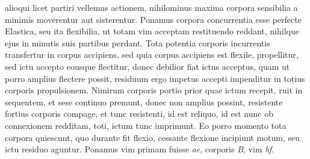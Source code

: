 alioqui licet partiri vellemus actionem, nihilominus maxima corpora sensibilia\protect{} a minimis moverentur 
aut sisterentur.
\pend
\newpage
\pstart
%
%
Ponamus corpora concurrentia esse perfecte Elastica\protect{}, seu ita flexibilia\protect{}, ut totam vim 
acceptam\protect{} restituendo reddant, nihilque ejus in minutis suis partibus 
%
% 
perdant.
\pend \pstart
Tota potentia\protect{} corporis 
%
incurrentis transfertur in corpus accipiens, sed 
%
quia %
corpus accipiens est flexile,
%
%
propellitur, sed ictu accepto\protect{} eousque
flectitur, donec debilior fiat ictus acceptus\protect{}, quam ut porro amplius flectere possit, residuum %
ergo impetus accepti\protect{} impenditur in totius corporis propulsionem.
%
Nimirum corporis 
portio prior quae ictum recepit, ruit in sequentem, et sese continuo premunt, donec 
non amplius possint, resistente fortius corporis compage, et tunc resistenti, id est reliquo,
id est nunc ob connexionem redditam, toti, ictum tunc imprimunt. Eo porro momento
tota corpora quiescunt, quo durante fit flexio\protect{}, cessante flexione\protect{} incipiunt motum, seu ictu
residuo aguntur. Ponamus 
%
%
vim primam fuisse
\textit{ae}, corporis \textit{B}, vim \textit{bf}. 
%
